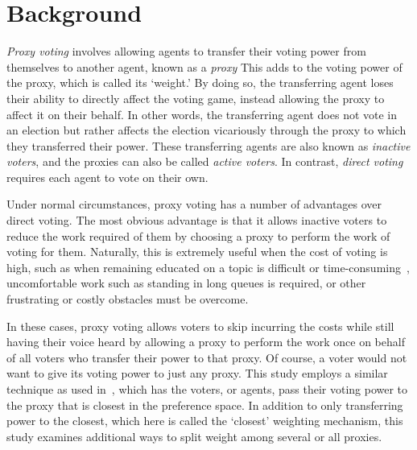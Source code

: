 

\section{Background}\label{sec:background}
\textit{Proxy voting} involves allowing agents to transfer their voting power
from themselves to another agent, known as a \textit{proxy}\cite[para.~1.4]
{Cohensius2017}  
This adds to the voting power of the proxy, which is called its `weight.'
By doing so, the transferring agent loses their ability to directly affect the
voting game, instead allowing the proxy to affect it on their behalf.
In other words, the transferring agent does not vote in an election but rather
affects the election vicariously through the proxy to which they transferred
their power.
These transferring agents are also known as \textit{inactive voters}, and the
proxies can also be called \textit{active voters}.
In contrast, \textit{direct voting} requires each agent to vote on their own.

Under normal circumstances, proxy voting has a number of advantages over direct voting.
The most obvious advantage is that it allows inactive voters to reduce the work
required of them by choosing a proxy to perform the work of voting for them.
Naturally, this is extremely useful when the cost of voting is high, such as
when remaining educated on a topic is difficult or
time-consuming~\cite[para.~1.1]{Mueller1972}, uncomfortable work such as
standing in long queues is required, or other frustrating or costly obstacles
must be overcome.  

In these cases, proxy voting allows voters to skip incurring the costs while
still having their voice heard by allowing a proxy to perform the work once on
behalf of all voters who transfer their power to that proxy.
Of course, a voter would not want to give its voting power to just any proxy.
This study employs a similar technique as used in~\cite{Cohensius2017}, which has the
voters, or agents, pass their voting power to the proxy that is closest in the
preference space.
In addition to only transferring power to the closest, which here is called the
`closest' weighting mechanism, this study examines additional ways to split weight
among several or all proxies.

